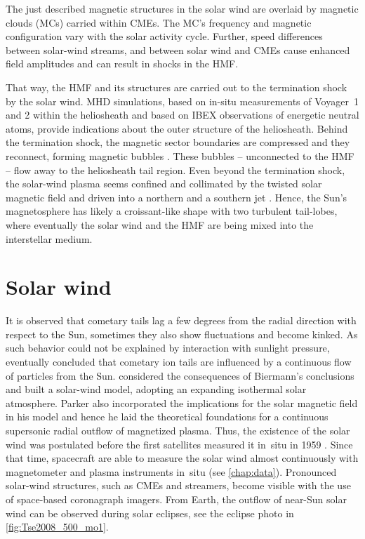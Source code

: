The just described magnetic structures in the solar wind are overlaid by magnetic clouds (MCs) carried within CMEs. The MC's frequency and magnetic configuration vary with the solar activity cycle. Further, speed differences between solar-wind streams, and between solar wind and CMEs cause enhanced field amplitudes and can result in shocks in the HMF.

That way, the HMF and its structures are carried out to the termination shock by the solar wind. MHD simulations, based on in-situ measurements of Voyager~1 and 2 within the heliosheath and based on IBEX observations of energetic neutral atoms, provide indications about the outer structure of the heliosheath. Behind the termination shock, the magnetic sector boundaries are compressed and they reconnect, forming magnetic bubbles \citep{Opher2011}. These bubbles -- unconnected to the HMF -- flow away to the heliosheath tail region. Even beyond the termination shock, the solar-wind plasma seems confined and collimated by the twisted solar magnetic field and driven into a northern and a southern jet \citep{Opher2015}. Hence, the Sun's magnetosphere has likely a croissant-like shape with two turbulent tail-lobes, where eventually the solar wind and the HMF are being mixed into the interstellar medium.


\section{Solar wind}
\label{sec:solar_wind}
It is observed that cometary tails lag a few degrees from the radial direction with respect to the Sun, sometimes they also show fluctuations and become kinked. As such behavior could not be explained by interaction with sunlight pressure, eventually \citet{Biermann1951} concluded that cometary ion tails are influenced by a continuous flow of particles from the Sun.	%
\citet{Parker1958} considered the consequences of Biermann's conclusions and built a solar-wind model, adopting an expanding isothermal solar atmosphere. Parker also incorporated the implications for the solar magnetic field in his model and hence he laid the theoretical foundations for a continuous supersonic radial outflow of magnetized plasma. Thus, the existence of the solar wind was postulated before the first satellites measured it in~situ in 1959 \citep{Gringauz1960,Neugebauer1966}. Since that time, spacecraft are able to measure the solar wind almost continuously with magnetometer and plasma instruments in~situ (see \autoref{chap:data}). Pronounced solar-wind structures, such as CMEs and streamers, become visible with the use of space-based coronagraph imagers. From Earth, the outflow of near-Sun solar wind can be observed during solar eclipses, see the eclipse photo in \autoref{fig:Tse2008_500_mo1}.

